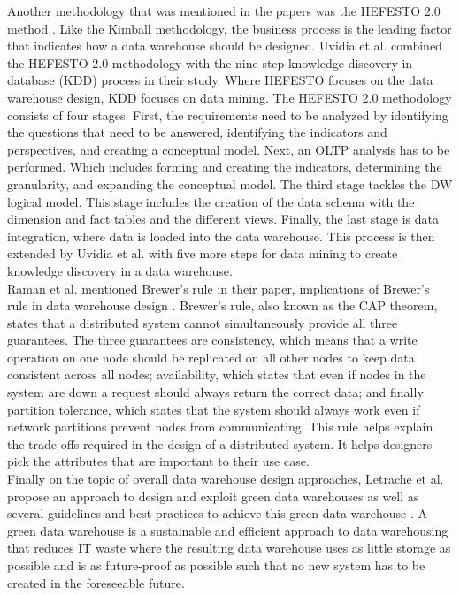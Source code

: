 \documentclass[11pt]{article}
\begin{document}
Another methodology that was mentioned in the papers was the HEFESTO 2.0 method \cite{uvidia2017moving}. Like the Kimball methodology, the business process is the leading factor that indicates how a data warehouse should be designed. Uvidia et al. combined the HEFESTO 2.0 methodology with the nine-step knowledge discovery in database (KDD) process in their study. Where HEFESTO focuses on the data warehouse design, KDD focuses on data mining. The HEFESTO 2.0 methodology consists of four stages. First, the requirements need to be analyzed by identifying the questions that need to be answered, identifying the indicators and perspectives, and creating a conceptual model. Next, an OLTP analysis has to be performed. Which includes forming and creating the indicators, determining the granularity, and expanding the conceptual model. The third stage tackles the DW logical model. This stage includes the creation of the data schema with the dimension and fact tables and the different views. Finally, the last stage is data integration, where data is loaded into the data warehouse. This process is then extended by Uvidia et al. with five more steps for data mining to create knowledge discovery in a data warehouse. \\

Raman et al. mentioned Brewer's rule in their paper, implications of Brewer's rule in data warehouse design \cite{raman2023implications}. Brewer's rule, also known as the CAP theorem, states that a distributed system cannot simultaneously provide all three guarantees. The three guarantees are consistency, which means that a write operation on one node should be replicated on all other nodes to keep data consistent across all nodes; availability, which states that even if nodes in the system are down a request should always return the correct data; and finally partition tolerance, which states that the system should always work even if network partitions prevent nodes from communicating. This rule helps explain the trade-offs required in the design of a distributed system. It helps designers pick the attributes that are important to their use case.\\

Finally on the topic of overall data warehouse design approaches, Letrache et al. propose an approach to design and exploit green data warehouses as well as several guidelines and best practices to achieve this green data warehouse \cite{letrache2018green}. A green data warehouse is a sustainable and efficient approach to data warehousing that reduces IT waste where the resulting data warehouse uses as little storage as possible and is as future-proof as possible such that no new system has to be created in the foreseeable future. \\
\end{document}
